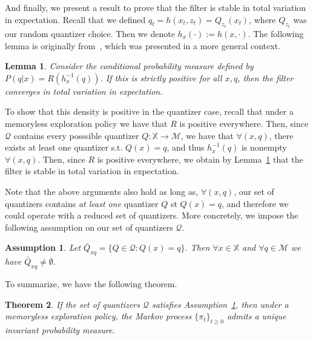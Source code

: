 \documentclass{article}
\newtheorem{theorem}{Theorem}[section]
\newtheorem{lemma}[theorem]{Lemma}
\newtheorem{assumption}{Assumption}[section]
\begin{document}
And finally, we present a result to prove that the filter is stable in total variation in expectation. Recall that we defined \(q_t = h(x_t,z_t) = Q_{z_t}(x_t)\), where \(Q_{z_t}\) was our random quantizer choice. Then we denote \(h_x(\cdot) := h(x,\cdot)\). The following lemma is originally from~\cite{Handel}, which was presented in a more general context.

\begin{lemma}\label{lemma:nondegenerate}\cite[Corollary 5.5]{Handel}
    Consider the conditional probability measure defined by \( P(q | x) = R(h_x^{-1}(q)) \). If this is strictly positive for all \(x,q\), then the filter converges in total variation in expectation.
\end{lemma}

To show that this density is positive in the quantizer case, recall that under a memoryless exploration policy we have that \(R\) is positive everywhere. Then, since \( \mathcal{Q} \) contains every posssible quantizer \( Q : \mathbb{X} \to \mathcal{M} \), we have that \( \forall (x,q) \), there exists at least one quantizer s.t. \( Q(x) = q \), and thus \( h_x^{-1}(q) \) is nonempty \( \forall (x,q) \). Then, since \(R\) is positive everywhere, we obtain by Lemma~\ref{lemma:nondegenerate} that the filter is stable in total variation in expectation.

Note that the above arguments also hold as long as, \( \forall (x,q) \), our set of quantizers contains \emph{at least one} quantizer \( Q \) st \( Q(x) = q \), and therefore we could operate with a reduced set of quantizers. More concretely, we impose the following assumption on our set of quantizers \( \mathcal{Q} \).

\begin{assumption}\label{assumption:one-bin}
    Let \( \bar{Q}_{xq} = \{Q \in \mathcal{Q} : Q(x) = q\} \). Then \( \forall x \in \mathbb{X} \) and \( \forall q \in \mathcal{M} \) we have \(\bar{Q}_{xq} \neq \emptyset \).

\end{assumption}

To summarize, we have the following theorem.

\begin{theorem}\label{theorem:invariant}
    If the set of quantizers \( \mathcal{Q} \) satisfies Assumption~\ref{assumption:one-bin}, then under a memoryless exploration policy, the Markov process \( \{\pi_t\}_{t\ge0} \) admits a unique invariant probability measure.
\end{theorem}
\end{document}
